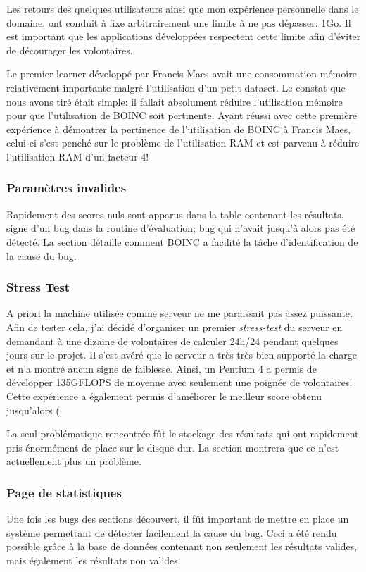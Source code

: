 \documentclass[a4paper, 11pt]{article}
\begin{document}
Les retours des quelques utilisateurs ainsi que mon expérience personnelle dans le domaine, ont conduit à fixe arbitrairement une limite à ne pas dépasser: 1Go. Il est important que les applications développées respectent cette limite afin d'éviter de décourager les volontaires.

Le premier learner développé par Francis Maes avait une consommation mémoire relativement importante malgré l'utilisation d'un petit dataset. Le constat que nous avons tiré était simple: il fallait absolument réduire l'utilisation mémoire pour que l'utilisation de \textsc{BOINC} soit pertinente. Ayant réussi avec cette première expérience à démontrer la pertinence de l'utilisation de \textsc{BOINC} à Francis Maes, celui-ci s'est penché sur le problème de l'utilisation RAM et est parvenu à réduire l'utilisation RAM d'un facteur 4!

\subsubsection{Paramètres invalides}
Rapidement des scores nuls sont apparus dans la table contenant les résultats, signe d'un bug dans la routine d'évaluation; bug qui n'avait jusqu'à alors pas été détecté. La section %
détaille comment \textsc{BOINC} a facilité la tâche d'identification de la cause du bug.


\subsubsection{Stress Test}
A priori la machine utilisée comme serveur ne me paraissait pas assez puissante. Afin de tester cela, j'ai décidé d'organiser un premier \textit{stress-test} du serveur en demandant à une dizaine de volontaires de calculer 24h/24 pendant quelques jours sur le projet. Il s'est avéré que le serveur a très très bien supporté la charge et n'a montré aucun signe de faiblesse. Ainsi, un Pentium 4 a permis de développer 135GFLOPS de moyenne avec seulement une poignée de volontaires! Cette expérience a également permis d'améliorer le meilleur score obtenu jusqu'alors (%
 
La seul problématique rencontrée fût le stockage des résultats qui ont rapidement pris énormément de place sur le disque dur. La section %
montrera que ce n'est actuellement plus un problème. 

\subsubsection{Page de statistiques}
Une fois les bugs des sections  %
découvert, il fût important de mettre en place un système permettant de détecter facilement la cause du bug. Ceci a été rendu possible grâce à la base de données contenant non seulement les résultats valides, mais également les résultats non valides.
\end{document}
